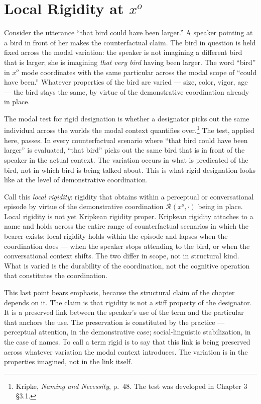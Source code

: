\documentclass[10pt]{article}
\begin{document}
\section{\texorpdfstring{Local Rigidity at \(x^o\)}{Local Rigidity at x\^{}o}}\label{local-rigidity-at-xo}

Consider the utterance ``that bird could have been larger.'' A speaker pointing at a bird in front of her makes the counterfactual claim. The bird in question is held fixed across the modal variation: the speaker is not imagining a different bird that is larger; she is imagining \emph{that very bird} having been larger. The word ``bird'' in \(x^o\) mode coordinates with the same particular across the modal scope of ``could have been.'' Whatever properties of the bird are varied --- size, color, vigor, age --- the bird stays the same, by virtue of the demonstrative coordination already in place.

The modal test for rigid designation is whether a designator picks out the same individual across the worlds the modal context quantifies over.\footnote{Kripke, \emph{Naming and Necessity}, p.~48. The test was developed in Chapter 3 §3.1.} The test, applied here, passes. In every counterfactual scenario where ``that bird could have been larger'' is evaluated, ``that bird'' picks out the same bird that is in front of the speaker in the actual context. The variation occurs in what is predicated of the bird, not in which bird is being talked about. This is what rigid designation looks like at the level of demonstrative coordination.

Call this \emph{local rigidity}: rigidity that obtains within a perceptual or conversational episode by virtue of the demonstrative coordination \(\mathcal{R}(x^o, \cdot)\) being in place. Local rigidity is not yet Kripkean rigidity proper. Kripkean rigidity attaches to a name and holds across the entire range of counterfactual scenarios in which the bearer exists; local rigidity holds within the episode and lapses when the coordination does --- when the speaker stops attending to the bird, or when the conversational context shifts. The two differ in scope, not in structural kind. What is varied is the durability of the coordination, not the cognitive operation that constitutes the coordination.

This last point bears emphasis, because the structural claim of the chapter depends on it. The claim is that rigidity is not a stiff property of the designator. It is a preserved link between the speaker's use of the term and the particular that anchors the use. The preservation is constituted by the practice --- perceptual attention, in the demonstrative case; social-linguistic stabilization, in the case of names. To call a term rigid is to say that this link is being preserved across whatever variation the modal context introduces. The variation is in the properties imagined, not in the link itself.
\end{document}
